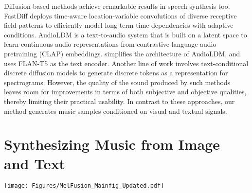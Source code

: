 Diffusion-based methods \cite{huang2022generspeech, huang2022prodiff, huang2022fastdiff, popov2021grad, lam2022bddm, lee2021priorgrad} achieve remarkable results in speech synthesis too. FastDiff \cite{huang2022fastdiff} deploys time-aware location-variable convolutions of diverse receptive field patterns to efficiently model long-term time dependencies with adaptive conditions. AudioLDM \cite{audioldm} is a text-to-audio system that is built on a latent space to learn continuous audio representations from contrastive language-audio pretraining (CLAP) embeddings. 
\citet{tango} simplifies the architecture of AudioLDM, and uses FLAN-T5 \cite{flant5} as the text encoder.
Another line of work \cite{yang2023diffsound, garcia2023vampnet} involves text-conditional discrete diffusion models to generate discrete tokens as a representation for spectrograms. However, the quality of the sound produced by such methods leaves room for improvements in terms of both subjective and objective qualities, thereby limiting their practical usability. 
In contrast to these approaches, our method generates music samples conditioned on visual and textual signals. 

 

\section{Synthesizing Music from Image and Text}
\label{sec:method}

\begin{figure*}
    \centering
    \texttt{[image: Figures/MelFusion\_Mainfig\_Updated.pdf]}
    \caption{Our approach \textbf{\modelname} generates music waveform $\bm{w}$ conditioned on an image $\bm{I}$ and a given textual instruction $\bm{Y}$. Visual semantics from  $\bm{I}$ is instilled into a text-to-music diffusion model (bottom green box) using a pre-trained and frozen text-to-image diffusion model (top blue box). The image $\bm{I}$ is first DDIM inverted into a noisy latent $\bm{z}^I_T$. The self-attention features from the decoder layers of the text-to-image LDM that consumes $\bm{z}^I_T$ is infused into the cross-attention features of text-to-music LDM decoder layers, modulated by learned $\alpha$ parameters. 
    This fusion operation that happens in the decoder (green stripes) is detailed on the right side of the figure. The music encoder projects the spectrogram representation of the music to the latent space, and the music decoder retrieves back the spectrograms. Finally, a vocoder generates the waveform $\bm{w}$ from the spectrograms. Please refer to \cref{sec:method} for more details. 
    }
    \label{fig:main-figure}
\end{figure*}

